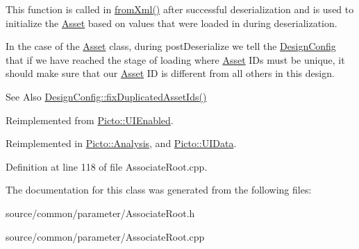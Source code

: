 This function is called in \hyperlink{class_picto_1_1_asset_a8bed4da09ecb1c07ce0dab313a9aba67}{from\-Xml()} after successful deserialization and is used to initialize the \hyperlink{class_picto_1_1_asset}{Asset} based on values that were loaded in during deserialization. 

In the case of the \hyperlink{class_picto_1_1_asset}{Asset} class, during post\-Deserialize we tell the \hyperlink{class_picto_1_1_design_config}{Design\-Config} that if we have reached the stage of loading where \hyperlink{class_picto_1_1_asset}{Asset} I\-Ds must be unique, it should make sure that our \hyperlink{class_picto_1_1_asset}{Asset} I\-D is different from all others in this design. \begin{DoxySeeAlso}{See Also}
\hyperlink{class_picto_1_1_design_config_ab57e0738b97e4358ab09530cd6815fc0}{Design\-Config\-::fix\-Duplicated\-Asset\-Ids()} 
\end{DoxySeeAlso}


Reimplemented from \hyperlink{class_picto_1_1_u_i_enabled_ae1585113a496ff2c8de3293aa884b57b}{Picto\-::\-U\-I\-Enabled}.



Reimplemented in \hyperlink{class_picto_1_1_analysis_a1495e960c7416afd2f443ae796ed0311}{Picto\-::\-Analysis}, and \hyperlink{class_picto_1_1_u_i_data_a5c9efa47c9f2e57d7c03a5a8f5169a98}{Picto\-::\-U\-I\-Data}.



Definition at line 118 of file Associate\-Root.\-cpp.



The documentation for this class was generated from the following files\-:\begin{DoxyCompactItemize}
\item 
source/common/parameter/Associate\-Root.\-h\item 
source/common/parameter/Associate\-Root.\-cpp\end{DoxyCompactItemize}
